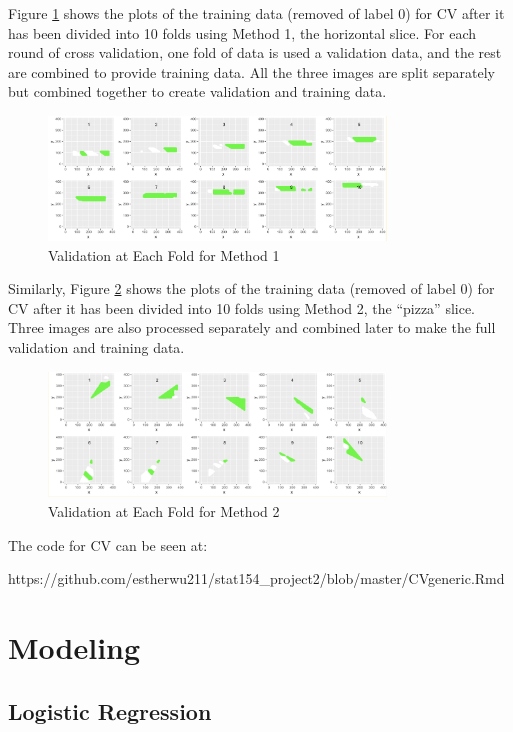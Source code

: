 \documentclass[11pt]{article}
\begin{document}
Figure \ref{fig:2-4-1} shows the plots of the training data (removed of label 0) for CV after it has been divided into 10 folds using Method 1, the horizontal slice. For each round of cross validation, one fold of data is used a validation data, and the rest are combined to provide training data. All the three images are split separately but combined together to create validation and training data.

\begin{figure}[h]
\includegraphics[width=0.8\textwidth]{2-4-2.jpeg}
\centering
\caption{Validation at Each Fold for Method 1}
\label{fig:2-4-1}
\centering
\end{figure}

Similarly, Figure \ref{fig:2-4-2} shows the plots of the training data (removed of label 0) for CV after it has been divided into 10 folds using Method 2, the ``pizza'' slice. Three images are also processed separately and combined later to make the full validation and training data. 

\begin{figure}[h]
\includegraphics[width=0.8\textwidth]{2-4-1.jpeg}
\centering
\caption{Validation at Each Fold for Method 2}
\label{fig:2-4-2}
\centering
\end{figure}

The code for CV can be seen at:

https://github.com/estherwu211/stat154\_project2/blob/master/CVgeneric.Rmd

\section{Modeling}

\subsection{Logistic Regression}
\end{document}

